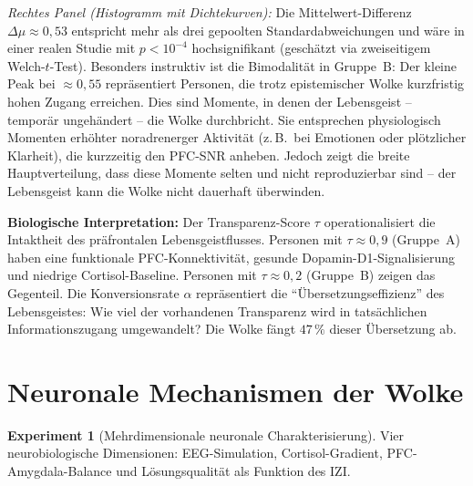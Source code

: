 ﻿\documentclass[12pt,a4paper]{report}
\theoremstyle{plain}
\theoremstyle{definition}
\newtheorem{experiment}[theorem]{Experiment}
\theoremstyle{remark}
\begin{document}
	\textit{Rechtes Panel (Histogramm mit Dichtekurven):}
	Die Mittelwert-Differenz $\Delta\mu \approx 0{,}53$ entspricht mehr als drei
	gepoolten Standardabweichungen und wäre in einer realen Studie
	mit $p < 10^{-4}$ hochsignifikant (geschätzt via zweiseitigem
	Welch-$t$-Test). Besonders instruktiv ist die Bimodalität in Gruppe~B:
	Der kleine Peak bei $\approx 0{,}55$ repräsentiert Personen, die
	trotz epistemischer Wolke kurzfristig hohen Zugang erreichen.
	Dies sind Momente, in denen der Lebensgeist -- temporär ungehändert --
	die Wolke durchbricht. Sie entsprechen physiologisch Momenten erhöhter
	noradrenerger Aktivität (z.\,B.\ bei Emotionen oder plötzlicher
	Klarheit), die kurzzeitig den PFC-SNR anheben.
	Jedoch zeigt die breite Hauptverteilung, dass diese Momente selten und nicht
	reproduzierbar sind -- der Lebensgeist kann die Wolke nicht dauerhaft überwinden.
	
	\textbf{Biologische Interpretation:}
	Der Transparenz-Score $\tau$ operationalisiert die Intaktheit des präfrontalen
	Lebensgeistflusses. Personen mit $\tau \approx 0{,}9$ (Gruppe~A) haben eine
	funktionale PFC-Konnektivität, gesunde Dopamin-D1-Signalisierung und niedrige
	Cortisol-Baseline. Personen mit $\tau \approx 0{,}2$ (Gruppe~B) zeigen das
	Gegenteil. Die Konversionsrate $\alpha$ repräsentiert die
	``Übersetzungseffizienz'' des Lebensgeistes: Wie viel der vorhandenen
	Transparenz wird in tatsächlichen Informationszugang umgewandelt?
	Die Wolke fängt $47\,\%$ dieser Übersetzung ab.
	
	\section{Neuronale Mechanismen der Wolke}
	
	\begin{experiment}[Mehrdimensionale neuronale Charakterisierung]
		Vier neurobiologische Dimensionen: EEG-Simulation, Cortisol-Gradient,
		PFC-Amygdala-Balance und Lösungsqualität als Funktion des IZI.
	\end{experiment}
	
\end{document}
